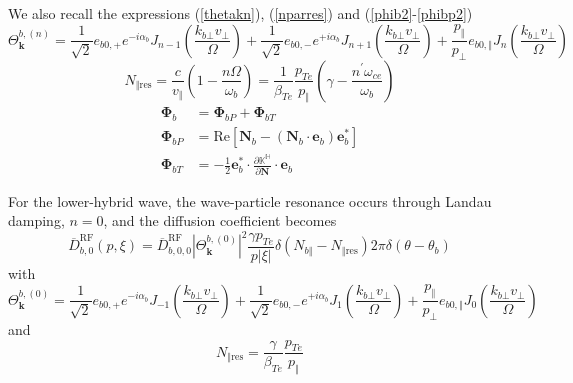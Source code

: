We also recall the expressions (\ref{thetakn}), (\ref{nparres}) and
(\ref{phib2}-\ref{phibp2})%
\begin{equation}
\Theta_{\mathbf{k}}^{b,\left(  n\right)  }=\frac{1}{\sqrt{2}}e_{b0,+}%
e^{-i\alpha_{b}}J_{n-1}\left(  \frac{k_{b\bot}v_{\bot}}{\Omega}\right)
+\frac{1}{\sqrt{2}}e_{b0,-}e^{+i\alpha_{b}}J_{n+1}\left(  \frac{k_{b\bot
}v_{\bot}}{\Omega}\right)  +\frac{p_{\Vert}}{p_{\bot}}e_{b0,\Vert}J_{n}\left(
\frac{k_{b\bot}v_{\bot}}{\Omega}\right)  \label{thetakn2}%
\end{equation}%
\begin{equation}
N_{\Vert\text{res}}=\frac{c}{v_{\Vert}}\left(  1-\frac{n\Omega}{\omega_{b}%
}\right)  =\frac{1}{\beta_{Te}}\frac{p_{Te}}{p_{\Vert}}\left(  \gamma
-\frac{n^{\prime}\omega_{ce}}{\omega_{b}}\right)  \label{nparres2}%
\end{equation}%
\begin{align}
\mathbf{\Phi}_{b}  &  =\mathbf{\Phi}_{bP}+\mathbf{\Phi}_{bT}\label{phib3}\\
\mathbf{\Phi}_{bP}  &  =\text{Re}\left[  \mathbf{N}_{b}-\left(  \mathbf{N}%
_{b}\cdot\mathbf{e}_{b}\right)  \mathbf{e}_{b}^{\ast}\right] \label{phibp3}\\
\mathbf{\Phi}_{bT}  &  =\mathbf{-}\frac{1}{2}\mathbf{e}_{b}^{\ast}\cdot
\frac{\partial\mathbb{{K}^{H}}}{\partial\mathbf{N}}\cdot\mathbf{e}_{b}
\label{phibt3}%
\end{align}


For the lower-hybrid wave, the wave-particle resonance occurs through Landau
damping, $n=0$, and the diffusion coefficient becomes%
\begin{equation}
\overline{D}_{b,0}^{\text{RF}}(p,\xi)=\overline{D}_{b,0,0}^{\text{RF}%
}\left\vert \Theta_{\mathbf{k}}^{b,\left(  0\right)  }\right\vert ^{2}%
\frac{\gamma p_{Te}}{p\left\vert \xi\right\vert }\delta\left(  N_{b\Vert
}-N_{\Vert\text{res}}\right)  2\pi\delta\left(  \theta-\theta_{b}\right)
\end{equation}
with
\begin{equation}
\Theta_{\mathbf{k}}^{b,\left(  0\right)  }=\frac{1}{\sqrt{2}}e_{b0,+}%
e^{-i\alpha_{b}}J_{-1}\left(  \frac{k_{b\bot}v_{\bot}}{\Omega}\right)
+\frac{1}{\sqrt{2}}e_{b0,-}e^{+i\alpha_{b}}J_{1}\left(  \frac{k_{b\bot}%
v_{\bot}}{\Omega}\right)  +\frac{p_{\Vert}}{p_{\bot}}e_{b0,\Vert}J_{0}\left(
\frac{k_{b\bot}v_{\bot}}{\Omega}\right)
\end{equation}
and%
\begin{equation}
N_{\Vert\text{res}}=\frac{\gamma}{\beta_{Te}}\frac{p_{Te}}{p_{\Vert}}%
\end{equation}


